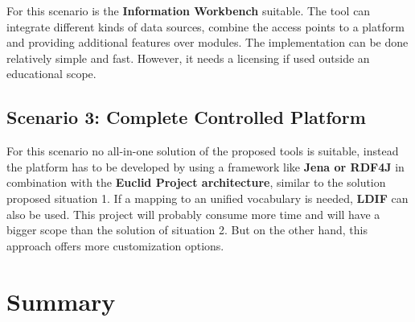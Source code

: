 For this scenario is the \textbf{Information Workbench} suitable. The tool can integrate different kinds of data sources, combine the access points to a platform and providing additional features over modules. The implementation can be done relatively simple and fast. However, it needs a licensing if used outside an educational scope.

\subsection{Scenario 3: Complete Controlled Platform}

For this scenario no all-in-one solution of the proposed tools is suitable, instead the platform has to be developed by using a framework like \textbf{Jena or RDF4J} in combination with the \textbf{Euclid Project architecture}, similar to the solution proposed situation 1. If a mapping to an unified vocabulary is needed, \textbf{LDIF} can also be used. This project will probably consume more time and will have a bigger scope than the solution of situation 2. But on the other hand, this approach offers more customization options.

\section{Summary}

